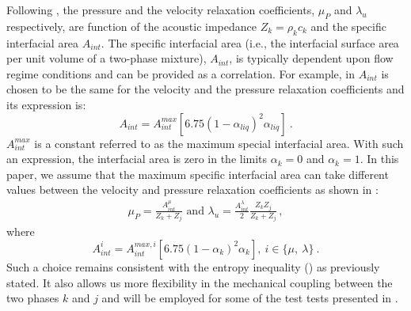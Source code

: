 \documentclass[preprint,10pt]{elsarticle}
\begin{document}
Following \cite{SEM}, the pressure and the velocity relaxation coefficients, $\mu_P$  and $\lambda_u$ respectively, are function of the acoustic 
impedance $Z_k = \rho_k c_k$ and the specific interfacial area $A_{int}$. The specific interfacial area (i.e., the interfacial surface area per unit
volume of a two-phase mixture), $A_{int}$, is typically dependent upon flow regime conditions and can be provided as a correlation. For example,
in \cite{SEM} $A_{int}$ is chosen to be the same for the velocity and the pressure relaxation coefficients and its expression is:
%
\begin{equation}\label{eq:Aint-def}
A_{int} = A_{int}^{max} \left[ 6.75 \left(1-\alpha_{liq} \right)^2 \alpha_{liq} \right] \ .
\end{equation}
% 
$A_{int}^{max}$ is a constant referred to as the maximum special interfacial area. %
With such an expression, the interfacial area is zero in the limits $\alpha_{k} = 0$ and $\alpha_{k} = 1$.
In this paper, we assume that the maximum specific interfacial area can take different values between the velocity and pressure relaxation 
coefficients as shown in :
%
\begin{subequations}
\label{eq:relaxation_coeff}
\begin{align}
  \label{E-R:86}
  \mu_P = \frac{A_{int}^\mu}{Z_{k}+Z_{j}} 
  \text{ and }
  \lambda_u = \frac{A_{int}^\lambda}{2}  \frac{Z_{k} Z_{j}}{Z_{k}+Z_{j}} \, ,
\end{align}
\end{subequations}
%
where
%
\begin{equation}\label{eq:Aint-sect4}
A_{int}^i = A_{int}^{max,i} \left[ 6.75 \left(1-\alpha_{k} \right)^2 \alpha_{k} \right] , \ i \in \{ \mu, \ \lambda \} \ .
\end{equation}
%
Such a choice remains consistent with the entropy inequality () as previously stated. It also allows us more 
flexibility in the mechanical coupling between the two phases $k$ and $j$ and will be employed for some of the test tests presented in .
\end{document}
